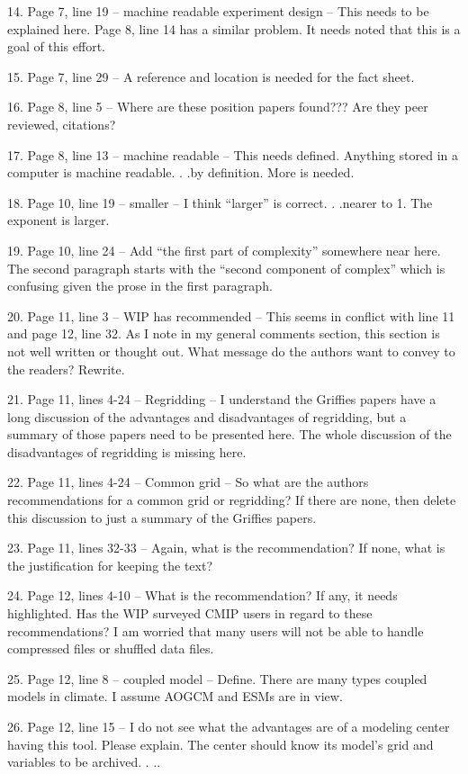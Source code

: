 \documentclass[gmd,manuscript]{copernicus}
\begin{document}
14. Page 7, line 19 – machine readable experiment design – This needs
to be explained here. Page 8, line 14 has a similar problem. It needs
noted that this is a goal of this effort.

15. Page 7, line 29 – A reference and location is needed for the fact sheet.

16. Page 8, line 5 – Where are these position papers found??? Are they
peer reviewed, citations?

17. Page 8, line 13 – machine readable – This needs defined. Anything
stored in a computer is machine readable. . .by definition. More is
needed.

18. Page 10, line 19 – smaller – I think “larger” is correct. .
.nearer to 1. The exponent is larger.

19. Page 10, line 24 – Add “the first part of complexity” somewhere
near here. The second paragraph starts with the “second component of
complex” which is confusing given the prose in the first paragraph.

20. Page 11, line 3 – WIP has recommended – This seems in conflict
with line 11 and page 12, line 32. As I note in my general comments
section, this section is not well written or thought out. What message
do the authors want to convey to the readers? Rewrite.

21. Page 11, lines 4-24 – Regridding – I understand the Griffies
papers have a long discussion of the advantages and disadvantages of
regridding, but a summary of those papers need to be presented here.
The whole discussion of the disadvantages of regridding is missing
here.

22. Page 11, lines 4-24 – Common grid – So what are the authors
recommendations for a common grid or regridding? If there are none,
then delete this discussion to just a summary of the Griffies papers.

23. Page 11, lines 32-33 – Again, what is the recommendation? If none,
what is the justification for keeping the text?

24. Page 12, lines 4-10 – What is the recommendation? If any, it needs
highlighted. Has the WIP surveyed CMIP users in regard to these
recommendations? I am worried that many users will not be able to
handle compressed files or shuffled data files.

25. Page 12, line 8 – coupled model – Define. There are many types
coupled models in climate. I assume AOGCM and ESMs are in view.

26. Page 12, line 15 – I do not see what the advantages are of a
modeling center having this tool. Please explain. The center should
know its model’s grid and variables to be archived. . ..
\end{document}
